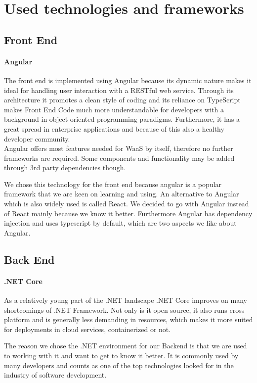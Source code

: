 \documentclass[titlepage, 12pt]{article}
\begin{document}
\section{Used technologies and frameworks}

\subsection{Front End}

\paragraph{Angular}
The front end is implemented using Angular because its dynamic nature makes it ideal for handling user interaction with a RESTful web service.
Through its architecture it promotes a clean style of coding and its reliance on TypeScript makes Front End Code much more understandable for developers with a background in object oriented programming paradigms.
Furthermore, it has a great spread in enterprise applications and because of this also a healthy developer community. \\
Angular offers most features needed for WaaS by itself, therefore no further frameworks are required. Some components and functionality may be added through 3rd party dependencies though.

We chose this technology for the front end because angular is a popular framework that we are keen on learning and using. An alternative to Angular which is also widely used is called React. We decided to go with Angular instead of React mainly because we know it better. Furthermore Angular has dependency injection and uses typescript by default, which are two aspects we like about Angular.

\subsection{Back End}

\paragraph{.NET Core}
As a relatively young part of the .NET landscape .NET Core improves on many shortcomings of .NET Framework. Not only is it open-source, it also runs cross-platform and is generally less demanding in resources,
which makes it more suited for deployments in cloud services, containerized or not.

The reason we chose the .NET environment for our Backend is that we are used to working with it and want to get to know it better. It is commonly used by many developers and counts as one of the top technologies looked for in the industry of software development.
\end{document}

